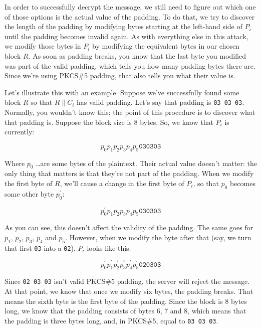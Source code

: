 \documentclass[11pt,ebook,table,dvipsnames]{memoir}
\begin{document}
In order to successfully decrypt the message, we still need to figure
out which one of those options is the actual value of the padding. To
do that, we try to discover the length of the padding by modifying
bytes starting at the left-hand side of $P_i$ until the padding
becomes invalid again. As with everything else in this attack, we
modify those bytes in $P_i$ by modifying the equivalent bytes in our
chosen block $R$. As soon as padding breaks, you know that the last
byte you modified was part of the valid padding, which tells you how
many padding bytes there are. Since we're using PKCS\#5 padding, that
also tells you what their value is.

Let's illustrate this with an example. Suppose we've successfully
found some block $R$ so that $R \| C_i$ has valid padding. Let's say
that padding is \verb~03 03 03~. Normally, you wouldn't know this; the
point of this procedure is to discover what that padding is. Suppose
the block size is 8 bytes. So, we know that $P_i$ is currently:

\begin{equation}
p_0 p_1 p_2 p_3 p_4 p_5 \mathtt{03} \mathtt{03} \mathtt{03}
\end{equation}

Where $p_0$ \ldots are some bytes of the plaintext. Their actual value
doesn't matter: the only thing that matters is that they're not part
of the padding. When we modify the first byte of $R$, we'll cause a
change in the first byte of $P_i$, so that $p_0$ becomes some other
byte $p^{\prime}_0$:

\begin{equation}
p^{\prime}_0 p_1 p_2 p_3 p_4 p_5 \mathtt{03} \mathtt{03} \mathtt{03}
\end{equation}

As you can see, this doesn't affect the validity of the padding. The
same goes for $p_1$, $p_2$, $p_3$, $p_4$ and $p_5$. However, when we
modify the byte after that (say, we turn that first \verb~03~ into a \verb~02~),
$P_i$ looks like this:

\begin{equation}
p^{\prime}_0 p^{\prime}_1 p^{\prime}_2 p^{\prime}_3 p^{\prime}_4 p^{\prime}_5 \mathtt{02} \mathtt{03} \mathtt{03}
\end{equation}

Since \verb~02 03 03~ isn't valid PKCS\#5 padding, the server will reject
the message. At that point, we know that once we modify six bytes, the
padding breaks. That means the sixth byte is the first byte of the
padding. Since the block is 8 bytes long, we know that the padding
consists of bytes 6, 7 and 8, which means that the padding is three
bytes long, and, in PKCS\#5, equal to \verb~03 03 03~.
\end{document}
